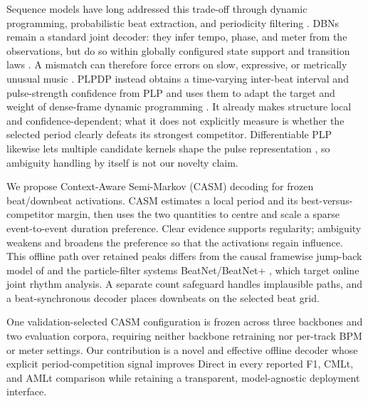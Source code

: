 \documentclass{article}
\begin{document}
Sequence models have long addressed this trade-off through dynamic programming,
probabilistic beat extraction, and periodicity filtering
\cite{ellis2007beattracking,korzeniowski2014crf,bock2015combfilter}. DBNs remain a
standard joint decoder: they infer tempo, phase, and meter from the observations,
but do so within globally configured state support and transition laws
\cite{krebs2015dbn,bock2016joint}. A mismatch can therefore force errors on slow,
expressive, or metrically unusual music \cite{foscarin2024beat,ahn2026smcblindspot}.
PLPDP instead obtains a time-varying inter-beat interval and pulse-strength
confidence from PLP and uses them to adapt the target and weight of dense-frame
dynamic programming \cite{chiu2023localperiodicity}. It already makes structure
local and confidence-dependent; what it does not explicitly measure is whether
the selected period clearly defeats its strongest competitor. Differentiable PLP
likewise lets multiple candidate kernels shape the pulse representation
\cite{chiu2025dplp}, so ambiguity handling by itself is not our novelty claim.

We propose Context-Aware Semi-Markov (CASM) decoding for frozen beat/downbeat
activations. CASM estimates a local period and its best-versus-competitor margin,
then uses the two quantities to centre and scale a sparse event-to-event duration
preference. Clear evidence supports regularity; ambiguity weakens and broadens
the preference so that the activations regain influence. This offline path over
retained peaks differs from the causal framewise jump-back model of
\cite{heydari2022semimarkov} and the particle-filter systems BeatNet/BeatNet+
\cite{heydari2021beatnet,heydari2024beatnetplus}, which target online joint rhythm
analysis. A separate count safeguard handles implausible paths, and a
beat-synchronous decoder places downbeats on the selected beat grid.

One validation-selected CASM configuration is frozen across three backbones and
two evaluation corpora, requiring neither backbone retraining nor per-track BPM
or meter settings. Our contribution is a novel and effective offline decoder
whose explicit period-competition signal improves Direct in every reported F1,
CMLt, and AMLt comparison while retaining a transparent, model-agnostic
deployment interface.
\end{document}
